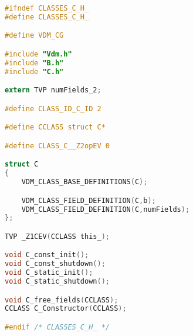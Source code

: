 \begin{lstlisting}[language=C,frame=tlbr,caption="File C.h."]
#ifndef CLASSES_C_H_
#define CLASSES_C_H_

#define VDM_CG

#include "Vdm.h"
#include "B.h"
#include "C.h"

extern TVP numFields_2;

#define CLASS_ID_C_ID 2

#define CCLASS struct C*

#define CLASS_C__Z2opEV 0

struct C
{
	VDM_CLASS_BASE_DEFINITIONS(C);

	VDM_CLASS_FIELD_DEFINITION(C,b);
	VDM_CLASS_FIELD_DEFINITION(C,numFields);
};

TVP _Z1CEV(CCLASS this_);

void C_const_init();
void C_const_shutdown();
void C_static_init();
void C_static_shutdown();

void C_free_fields(CCLASS);
CCLASS C_Constructor(CCLASS);

#endif /* CLASSES_C_H_ */

\end{lstlisting}
%
%
%
